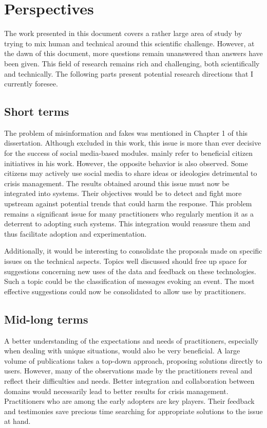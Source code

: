 \section{Perspectives}
The work presented in this document covers a rather large area of study by trying to mix human and technical around this scientific challenge.
However, at the dawn of this document, more questions remain unanswered than answers have been given.
This field of research remains rich and challenging, both scientifically and technically.
The following parts present potential research directions that I currently foresee.

\subsection{Short terms}
The problem of misinformation and fakes was mentioned in Chapter 1 of this dissertation.
Although excluded in this work, this issue is more than ever decisive for the success of social media-based modules.
\textcite{batardIntegrerContributionsCitoyennes2021} mainly refer to beneficial citizen initiatives in his work.
However, the opposite behavior is also observed.
Some citizens may actively use social media to share ideas or ideologies detrimental to crisis management.
The results obtained around this issue must now be integrated into systems.
Their objectives would be to detect and fight more upstream against potential trends that could harm the response.
This problem remains a significant issue for many practitioners who regularly mention it as a deterrent to adopting such systems.
This integration would reassure them and thus facilitate adoption and experimentation.

Additionally, it would be interesting to consolidate the proposals made on specific issues on the technical aspects.
Topics well discussed should free up space for suggestions concerning new uses of the data and feedback on these technologies.
Such a topic could be the classification of messages evoking an event.
The most effective suggestions could now be consolidated to allow use by practitioners.

\subsection{Mid-long terms}
A better understanding of the expectations and needs of practitioners, especially when dealing with unique situations, would also be very beneficial.
A large volume of publications takes a top-down approach, proposing solutions directly to users.
However, many of the observations made by the practitioners reveal and reflect their difficulties and needs.
Better integration and collaboration between domains would necessarily lead to better results for crisis management.
Practitioners who are among the early adopters are key players.
Their feedback and testimonies save precious time searching for appropriate solutions to the issue at hand.

